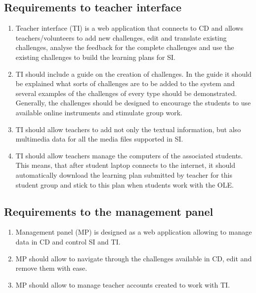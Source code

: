 \documentclass[a4paper]{article}
\begin{document}
\subsection{Requirements to teacher interface}

\begin{enumerate}
\item Teacher interface (TI) is a web application that connects to CD and allows teachers/volunteers to add new challenges, edit and translate existing challenges, analyse the feedback for the complete challenges and use the existing challenges to build the learning plans for SI.

\item TI should include a guide on the creation of challenges. In the guide it should be explained what sorts of challenges are to be added to the system and several examples of the challenges of every type should be demonstrated. Generally, the challenges should be designed to encourage the students to use available online instruments and stimulate group work.

\item TI should allow teachers to add not only the textual information, but also multimedia data for all the media files supported in SI.

\item TI should allow teachers manage the computers of the associated students. This means, that after student laptop connects to the internet, it should automatically download the learning plan submitted by teacher for this student group and stick to this plan when students work with the OLE.
\end{enumerate}


\subsection{Requirements to the management panel}

\begin{enumerate}
\item Management panel (MP) is designed as a web application allowing to manage data in CD and control SI and TI. 

\item MP should allow to navigate through the challenges available in CD, edit and remove them with ease.

\item MP should allow to manage teacher accounts created to work with TI.
\end{enumerate}
\end{document}
